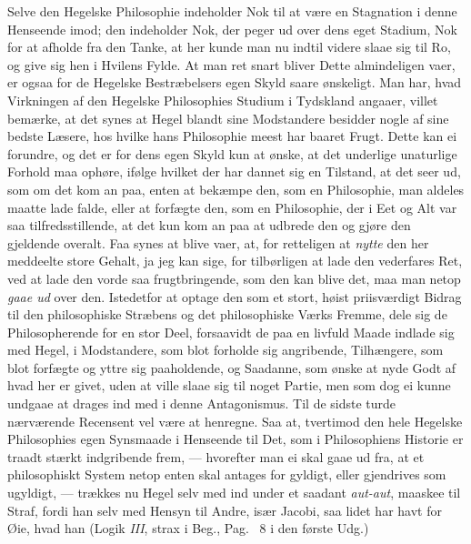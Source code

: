 \documentclass[12pt,a4paper]{book}
\newcommand{\apage}[1]{\marginnote{\footnotesize\textit{[#1]}}}
\begin{document}
Selve den Hegelske Philosophie indeholder Nok til at være en Stagnation i
denne Henseende imod; den indeholder Nok, der peger ud over dens eget
Stadium, Nok for at afholde fra den Tanke, at her kunde man nu indtil videre
slaae sig til Ro, og give sig hen i Hvilens Fylde. At man ret snart bliver
Dette \apage{31} almindeligen vaer, er ogsaa for de Hegelske Bestræbelsers egen Skyld
saare ønskeligt. Man har, hvad Virkningen af den Hegelske Philosophies
Studium i Tydskland angaaer, villet bemærke, at det synes at Hegel blandt
sine Modstandere besidder nogle af sine bedste Læsere, hos hvilke hans
Philosophie meest har baaret Frugt. Dette kan ei forundre, og det er for
dens egen Skyld kun at ønske, at det underlige unaturlige Forhold maa
ophøre, ifølge hvilket der har dannet sig en Tilstand, at det seer ud, som
om det kom an paa, enten at bekæmpe den, som en Philosophie, man aldeles
maatte lade falde, eller at forfægte den, som en Philosophie, der i Eet og
Alt var saa tilfredsstillende, at det kun kom an paa at udbrede den og gjøre
den gjeldende overalt. Faa synes at blive vaer, at, for retteligen at \emph{nytte}
den her meddeelte store Gehalt, ja jeg kan sige, for tilbørligen at lade den
vederfares Ret, ved at lade den vorde saa frugtbringende, som den kan blive
det, maa man netop \emph{gaae ud} over den. Istedetfor at optage den som et stort,
høist priisværdigt Bidrag til den philosophiske Stræbens og det
philosophiske Værks Fremme, dele sig de Philosopherende for en stor Deel,
forsaavidt de paa en livfuld Maade indlade sig med Hegel, i Modstandere, som
blot forholde sig angribende, Tilhængere, som blot forfægte og yttre sig
paaholdende, og Saadanne, som ønske at nyde Godt af hvad her er givet, uden
at ville slaae sig til noget Partie, men som dog ei kunne undgaae at drages
ind med i denne Antagonismus. Til de sidste turde nærværende Recensent vel
være at henregne. Saa at, tvertimod den hele Hegelske Philosophies egen
Synsmaade i Henseende til Det, som i Philosophiens Historie er traadt stærkt
indgribende frem, --- hvorefter man ei skal gaae ud fra, at et philosophiskt
System netop enten skal antages for gyldigt, eller gjendrives som ugyldigt,
--- trækkes nu Hegel selv med ind under et saadant \textit{aut-aut}, maaskee
til Straf, fordi han selv med Hensyn til Andre, især Jacobi, saa lidet har
havt for Øie, hvad han (Logik \textit{III}, strax i Beg., Pag.\ \apage{32} 8 i den første Udg.)
\end{document}
